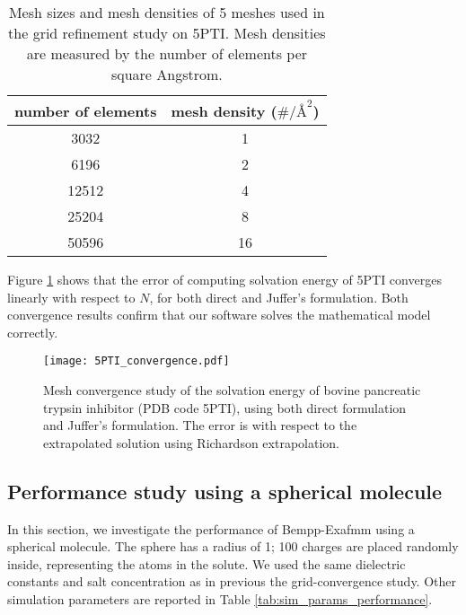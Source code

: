 \begin{table}[]
    \centering
    \begin{tabular}{cc}
    number of elements & mesh density ($\#/{\si{\angstrom}}^2$) \\
    \hline
    3032               & 1                                       \\
    6196               & 2                                       \\
    12512              & 4                                       \\
    25204              & 8                                       \\
    50596              & 16                                     
    \end{tabular}
    \caption{Mesh sizes and mesh densities of 5 meshes used in the grid refinement study on 5PTI. Mesh densities are measured by the number of elements per square Angstrom.}
    \label{tab:5PTI_mesh}
\end{table}

Figure \ref{fig:5PTI_convergence} shows that the error of computing solvation energy of 5PTI converges linearly with respect to $N$, for both direct and Juffer's formulation.
Both convergence results confirm that our software solves the mathematical model correctly.

\begin{figure}[htbp]
    \centering
    \texttt{[image: 5PTI\_convergence.pdf]} 
    \caption{Mesh convergence study of the solvation energy of bovine pancreatic trypsin inhibitor (PDB code 5PTI), using both direct formulation and Juffer's formulation.
    The error is with respect to the extrapolated solution using Richardson extrapolation.}
    \label{fig:5PTI_convergence}
\end{figure}

\subsection{Performance study using a spherical molecule}

In this section, we investigate the performance of Bempp-Exafmm using a spherical molecule.
The sphere has a radius of 1; 100 charges are placed randomly inside, representing the atoms in the solute.
We used the same dielectric constants and salt concentration as in previous the grid-convergence study.
Other simulation parameters are reported in Table \ref{tab:sim_params_performance}.

